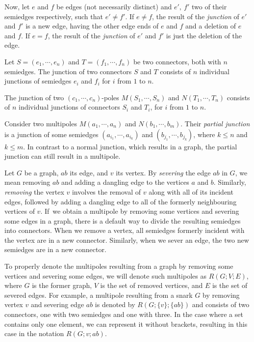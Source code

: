Now, let $e$ and $f$ be edges (not necessarily distinct) and $e',~f'$ two of their semiedges respectively, such that $e'\neq f'$. If $e\neq f$, the result of the \textit{junction} of $e'$ and $f'$ is a new edge, having the other edge ends of $e$ and $f$ and a deletion of $e$ and $f$. If $e=f$, the result of the \textit{junction} of $e'$ and $f'$ is just the deletion of the edge.

Let $S=(e_1,\cdots,e_n)$ and $T=(f_1,\cdots,f_n)$ be two connectors, both with $n$ semiedges. The junction of two connectors $S$ and $T$ consists of $n$ individual junctions of semiedges $e_i$ and $f_i$ for $i$ from $1$ to $n$.

The junction of two $(c_1,\cdots,c_n)$-poles $M(S_1,\cdots,S_n)$ and $N(T_1,\cdots,T_n)$ consists of $n$ individual junctions of connectors $S_i$ and $T_i$, for $i$ from $1$ to $n$.

Consider two multipoles $M(a_1,\cdots,a_n)$ and $N(b_1,\cdots,b_m)$. Their \textit{partial junction} is a junction of some semiedges $(a_{i_1},\cdots, a_{i_k})$ and $(b_{j_1},\cdots, b_{j_k})$, where $k\leq n$ and $k\leq m$. In contrast to a normal junction, which results in a graph, the partial junction can still result in a multipole.

Let $G$ be a graph, $ab$ its edge, and $v$ its vertex. By \textit{severing} the edge $ab$ in $G$, we mean removing $ab$ and adding a dangling edge to the vertices $a$ and $b$. Similarly, \textit{removing} the vertex $v$ involves the removal of $v$ along with all of its incident edges, followed by adding a dangling edge to all of the formerly neighbouring vertices of $v$. If~we obtain a multipole by removing some vertices and severing some edges in a graph, there is a default way to divide the resulting semiedges into connectors. When we remove a vertex, all semiedges formerly incident with the vertex are in a new connector. Similarly, when we sever an edge, the two new semiedges are in a new connector.

To properly denote the multipoles resulting from a graph by removing some vertices and severing some edges, we will denote such multipoles as $R(G;V;E)$, where $G$ is the former graph, $V$ is the set of removed vertices, and $E$ is the set of severed edges. For example, a multipole resulting from a snark $G$ by removing vertex $v$ and severing edge $ab$ is denoted by $R(G;\{v\}; \{ab\})$ and consists of two connectors, one with two semiedges and one with three. In the case where a set contains only one element, we can represent it without brackets, resulting in this case in the notation $R(G;v; ab)$.